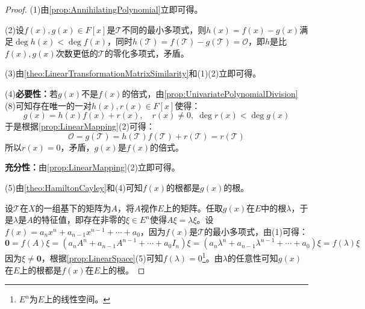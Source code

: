 \begin{proof}
	(1)由\cref{prop:AnnihilatingPolynomial}立即可得。\par
	(2)设$f(x),g(x)\in F[x]$是$\mathcal{T}$不同的最小多项式，则$h(x)=f(x)-g(x)$满足$\deg h(x)<\deg f(x)$，同时$h(\mathcal{T})=f(\mathcal{T})-g(\mathcal{T})=\mathcal{O}$，即$h$是比$f(x),g(x)$次数更低的$\mathcal{T}$的零化多项式，矛盾。\par
	(3)由\cref{theo:LinearTransformationMatrixSimilarity}和(1)(2)立即可得。\par
	(4)\textbf{必要性：}若$g(x)$不是$f(x)$的倍式，由\cref{prop:UnivariatePolynomialDivision}(8)可知存在唯一的一对$h(x),r(x)\in F[x]$使得：
	\begin{equation*}
		g(x)=h(x)f(x)+r(x),\quad r(x)\ne0,\;\deg r(x)<\deg g(x)
	\end{equation*}
	于是根据\cref{prop:LinearMapping}(2)可得：
	\begin{equation*}
		\mathcal{O}=g(\mathcal{T})=h(\mathcal{T})f(\mathcal{T})+r(\mathcal{T})=r(\mathcal{T})
	\end{equation*}
	所以$r(x)=0$，矛盾，$g(x)$是$f(x)$的倍式。\par
	\textbf{充分性：}由\cref{prop:LinearMapping}(2)立即可得。\par
	(5)由\cref{theo:HamiltonCayley}和(4)可知$f(x)$的根都是$g(x)$的根。\par
	设$\mathcal{T}$在$X$的一组基下的矩阵为$A$，将$A$视作$E$上的矩阵。任取$g(x)$在$E$中的根$\lambda$，于是$\lambda$是$A$的特征值，即存在非零的$\xi\in E^n$使得$A\xi=\lambda\xi$。设$f(x)=a_nx^n+a_{n-1}x^{n-1}+\cdots+a_0$，因为$f(x)$是$\mathcal{T}$的最小多项式，由(1)可得：
	\begin{equation*}
		\mathbf{0}=f(A)\xi=(a_nA^n+a_{n-1}A^{n-1}+\cdots+a_0I_n)\xi=(a_n\lambda^n+a_{n-1}\lambda^{n-1}+\cdots+a_0)\xi=f(\lambda)\xi
 	\end{equation*}
	因为$\xi\ne\mathbf{0}$，根据\cref{prop:LinearSpace}(5)可知$f(\lambda)=0$\footnote{$E^n$为$E$上的线性空间。}。由$\lambda$的任意性可知$g(x)$在$E$上的根都是$f(x)$在$E$上的根。\par

\end{proof}
